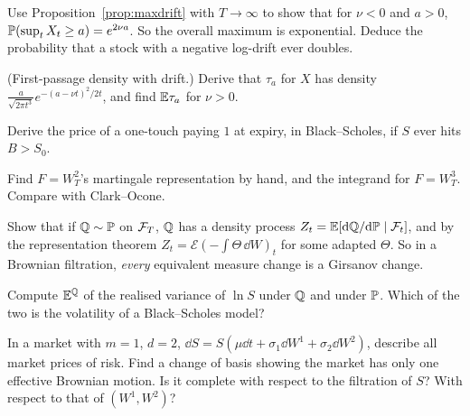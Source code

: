 \begin{exercises}
\item Use Proposition~\ref{prop:maxdrift} with $T\to\infty$ to show that for $\nu<0$ and $a>0$, $\mathbb{P}(\sup_tX_t\ge a)=e^{2\nu a}$. So the overall maximum is exponential. Deduce the probability that a stock with a negative log-drift ever doubles.
\item (First-passage density with drift.) Derive that $\tau_a$ for $X$ has density $\frac{a}{\sqrt{2\pi t^3}}e^{-(a-\nu t)^2/2t}$, and find $\mathbb{E}\tau_a$ for $\nu>0$.
\item Derive the price of a one-touch paying $1$ at expiry, in Black--Scholes, if $S$ ever hits $B>S_0$.
\item Find $F=W_T^2$'s martingale representation by hand, and the integrand for $F=W_T^3$. Compare with Clark--Ocone.
\item Show that if $\mathbb{Q}\sim\mathbb{P}$ on $\mathcal{F}_T$, $\mathbb{Q}$ has a density process $Z_t=\mathbb{E}[\mathrm{d}\mathbb{Q}/\mathrm{d}\mathbb{P}\mid\mathcal{F}_t]$, and by the representation theorem $Z_t=\mathcal{E}(-\int\Theta\,\dd W)_t$ for some adapted $\Theta$. So in a Brownian filtration, \emph{every} equivalent measure change is a Girsanov change.
\item Compute $\mathbb{E}^{\mathbb{Q}}$ of the realised variance of $\ln S$ under $\mathbb{Q}$ and under $\mathbb{P}$. Which of the two is the volatility of a Black--Scholes model?
\item In a market with $m=1$, $d=2$, $\dd S=S(\mu\dd t+\sigma_1\dd W^1+\sigma_2\dd W^2)$, describe all market prices of risk. Find a change of basis showing the market has only one effective Brownian motion. Is it complete with respect to the filtration of $S$? With respect to that of $(W^1,W^2)$?
\end{exercises}
